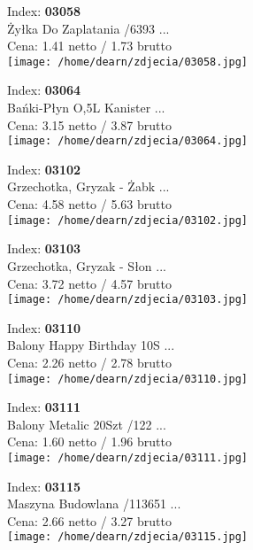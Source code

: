 {Index: \textbf{03058}\\
Żyłka Do Zaplatania /6393 ...\\
Cena: 1.41 netto / 1.73 brutto\\
  \texttt{[image: /home/dearn/zdjecia/03058.jpg]}}\newline\newline

{Index: \textbf{03064}\\
Bańki-Płyn O,5L  Kanister ...\\
Cena: 3.15 netto / 3.87 brutto\\
  \texttt{[image: /home/dearn/zdjecia/03064.jpg]}}\newline\newline

{Index: \textbf{03102}\\
Grzechotka, Gryzak - Żabk ...\\
Cena: 4.58 netto / 5.63 brutto\\
  \texttt{[image: /home/dearn/zdjecia/03102.jpg]}}\newline\newline

{Index: \textbf{03103}\\
Grzechotka, Gryzak - Słon ...\\
Cena: 3.72 netto / 4.57 brutto\\
  \texttt{[image: /home/dearn/zdjecia/03103.jpg]}}\newline\newline

{Index: \textbf{03110}\\
Balony Happy Birthday 10S ...\\
Cena: 2.26 netto / 2.78 brutto\\
  \texttt{[image: /home/dearn/zdjecia/03110.jpg]}}\newline\newline

{Index: \textbf{03111}\\
Balony Metalic 20Szt /122 ...\\
Cena: 1.60 netto / 1.96 brutto\\
  \texttt{[image: /home/dearn/zdjecia/03111.jpg]}}\newline\newline

{Index: \textbf{03115}\\
Maszyna Budowlana /113651 ...\\
Cena: 2.66 netto / 3.27 brutto\\
  \texttt{[image: /home/dearn/zdjecia/03115.jpg]}}\newline\newline

